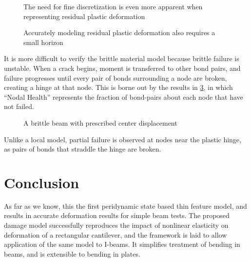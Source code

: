 \documentclass[11pt]{amsart}
\newcommand{\plotpath}{./plots}
\begin{document}
%
\begin{figure}[h]
  \centering
  \scalebox{.6}{}
  \caption{The need for fine discretization is even more apparent when representing residual plastic deformation}
  \label{fig:ResidualPlasticityN}
\end{figure}
%
\begin{figure}[h]
  \centering
  \scalebox{.6}{}
  \caption{Accurately modeling residual plastic deformation also requires a small horizon}
  \label{fig:ResidualPlasticityH}
\end{figure}
%

It is more difficult to verify the brittle material model because brittle failure is unstable.
When a crack begins, moment is transferred to other bond pairs, and failure progresses until every pair of bonds surrounding a node are broken, creating a hinge at that node.
This is borne out by the results in \cref{fig:brittleBeam}, in which ``Nodal Health'' represents the fraction of bond-pairs about each node that have not failed.

\begin{figure}[h]
  \centering
  \scalebox{.65}{}
  \caption{A brittle beam with prescribed center displacement}
  \label{fig:brittleBeam}
\end{figure}

Unlike a local model, partial failure is observed at nodes near the plastic hinge, as pairs of bonds that straddle the hinge are broken.

\section{Conclusion}
\label{sec:Conclusion}

As far as we know, this the first peridynamic state based thin feature model, and results in accurate deformation results for simple beam tests.
The proposed damage model successfully reproduces the impact of nonlinear elasticity on deformation of a rectangular cantilever, and the framework is laid to allow application of the same model to I-beams.
It simplifies treatment of bending in beams, and is extensible to bending in plates.




\end{document}
